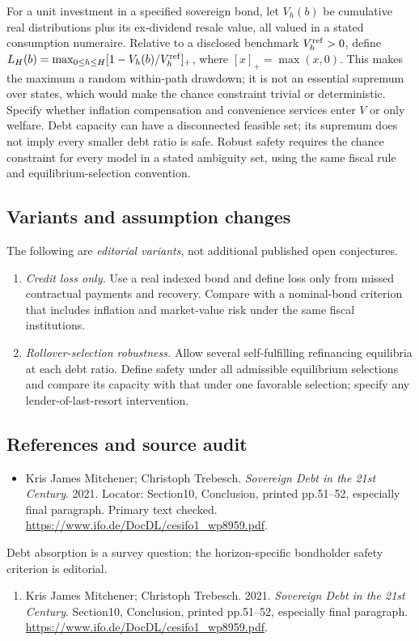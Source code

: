 \documentclass[11pt,a4paper]{article}
\begin{document}
For a unit investment in a specified sovereign bond, let \(V_h(b)\) be cumulative real distributions plus its ex-dividend resale value, all valued in a stated consumption numeraire. Relative to a disclosed benchmark \(V_h^{\rm ref}>0\), define \(L_H(b)=\max_{0\le h\le H}[1-V_h(b)/V_h^{\rm ref}]_+\), where \([x]_+=\max(x,0)\). This makes the maximum a random within-path drawdown; it is not an essential supremum over states, which would make the chance constraint trivial or deterministic. Specify whether inflation compensation and convenience services enter \(V\) or only welfare. Debt capacity can have a disconnected feasible set; its supremum does not imply every smaller debt ratio is safe. Robust safety requires the chance constraint for every model in a stated ambiguity set, using the same fiscal rule and equilibrium-selection convention.
\subsection*{Variants and assumption changes}
The following are \emph{editorial variants}, not additional published open conjectures.
\begin{enumerate}
\item \emph{Credit loss only.} Use a real indexed bond and define loss only from missed contractual payments and recovery. Compare with a nominal-bond criterion that includes inflation and market-value risk under the same fiscal institutions.
\item \emph{Rollover-selection robustness.} Allow several self-fulfilling refinancing equilibria at each debt ratio. Define safety under all admissible equilibrium selections and compare its capacity with that under one favorable selection; specify any lender-of-last-resort intervention.
\end{enumerate}
\subsection*{References and source audit}
\begin{itemize}
\item Kris James Mitchener; Christoph Trebesch. \emph{Sovereign Debt in the 21st Century}. 2021. Locator: Section10, Conclusion, printed pp.51--52, especially final paragraph. Primary text checked. \url{https://www.ifo.de/DocDL/cesifo1_wp8959.pdf}.
\end{itemize}
Debt absorption is a survey question; the horizon-specific bondholder safety criterion is editorial.
\begin{enumerate}\raggedright
\item\hypertarget{definitions:source:30007535:1}{} Kris James Mitchener; Christoph Trebesch. 2021. \emph{Sovereign Debt in the 21st Century}. Section10, Conclusion, printed pp.51--52, especially final paragraph.
\url{https://www.ifo.de/DocDL/cesifo1_wp8959.pdf}.
\end{enumerate}
\end{document}

